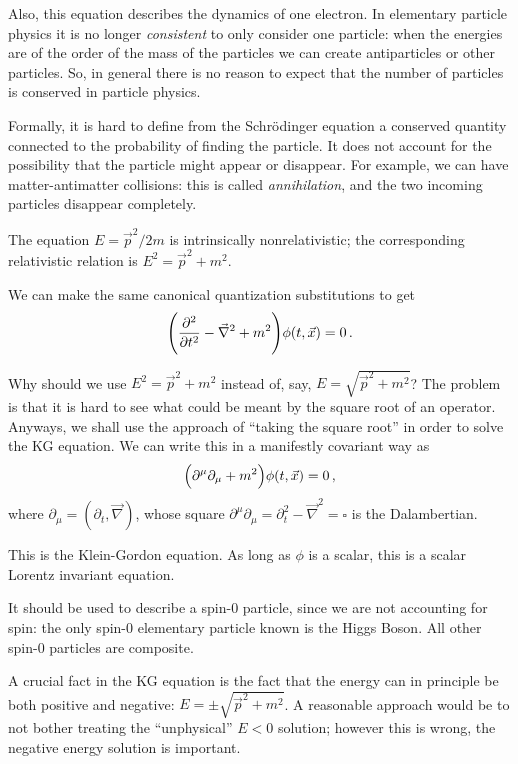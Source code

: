 \documentclass[main.tex]{subfiles}
\begin{document}
Also, this equation describes the dynamics of one electron. In elementary particle physics it is no longer \emph{consistent} to only consider one particle: 
when the energies are of the order of the mass of the particles we can create antiparticles or other particles. 
So, in general there is no reason to expect that the number of particles is conserved in particle physics. 

Formally, it is hard to define from the Schrödinger equation a conserved quantity connected to the probability of finding the particle. 
It does not account for the possibility that the particle might appear or disappear. 
For example, we can have matter-antimatter collisions: this is called \emph{annihilation}, and the two incoming particles disappear completely.

The equation \(E = \vec{p}^2 / 2m \) is intrinsically nonrelativistic; the corresponding relativistic relation is \(E^2 = \vec{p}^2 + m^2\). 

We can make the same canonical quantization substitutions to get 
%
\begin{align}
\qty(\pdv[2]{}{t} - \vec{\nabla}^2 + m^2) \phi (t, \vec{x}) = 0
\,.
\end{align}

Why should we use \(E^2 = \vec{p}^2 + m^2\) instead of, say, \(E = \sqrt{\vec{p}^2 + m^2}\)? 
The problem is that it is hard to see what could be meant by the square root of an operator. 
Anyways, we shall use the approach of ``taking the square root'' in order to solve the KG equation. 
We can write this in a manifestly covariant way as 
%
\begin{align}
\qty(\partial^{\mu } \partial_{\mu } + m^2) \phi (t, \vec{x}) = 0
\,,
\end{align}
%
where \(\partial_{\mu } = (\partial_{t}, \vec{\nabla})\), whose square \(\partial^{\mu } \partial_{\mu } = \partial_{t}^2 - \vec{\nabla}^2 = \square\) is the Dalambertian.

This is the Klein-Gordon equation. 
As long as \(\phi \) is a scalar, this is a scalar Lorentz invariant equation. 

It should be used to describe a spin-0 particle, since we are not accounting for spin: the only spin-0 elementary particle known is the Higgs Boson. 
All other spin-0 particles are composite. 

A crucial fact in the KG equation is the fact that the energy can in principle be both positive and negative: \(E = \pm \sqrt{\vec{p}^2 + m^2}\). 
A reasonable approach would be to not bother treating the ``unphysical'' \(E<0\) solution; however this is wrong, the negative energy solution is important. 
\end{document}
